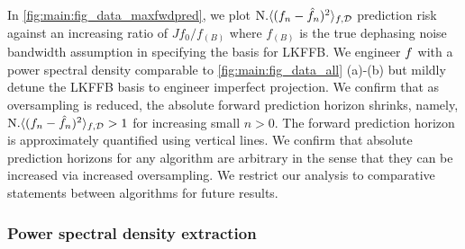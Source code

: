 In \cref{fig:main:fig_data_maxfwdpred}, we plot $\text{N.} \langle (f_n - \hat{f}_n)^2 \rangle_{f, \mathcal{D}}$ prediction risk against an increasing ratio of $Jf_0 / f_{(B)}$ where $f_{(B)}$ is the true dephasing noise bandwidth assumption in specifying the basis for LKFFB. We engineer $f$ with a power spectral density comparable to \cref{fig:main:fig_data_all} (a)-(b) but mildly detune the LKFFB basis to engineer imperfect projection. We confirm that as oversampling is reduced, the absolute forward prediction horizon shrinks, namely, $\text{N.} \langle (f_n - \hat{f}_n)^2 \rangle_{f, \mathcal{D}} > 1 $ for increasing small $n>0$. The forward prediction horizon is approximately quantified using vertical lines. We confirm that absolute prediction horizons for any algorithm are arbitrary in the sense that they can be increased via increased oversampling. We restrict our analysis to comparative statements between algorithms for future results. 

\subsubsection{Power spectral density extraction}

